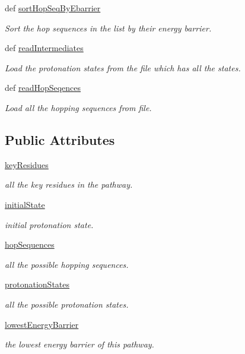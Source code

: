 \begin{DoxyCompactItemize}
def \hyperlink{classxhbpathpy_1_1hb_path_1_1_hb_path_a0b4b8d9d382c3b83d5c8d6c0b4078604}{sort\-Hop\-Seq\-By\-Ebarrier}
\begin{DoxyCompactList}\small\item\em Sort the hop sequences in the list by their energy barrier. \end{DoxyCompactList}\item 
def \hyperlink{classxhbpathpy_1_1hb_path_1_1_hb_path_aca89881c314dad892de2ce8867fda4cf}{read\-Intermediates}
\begin{DoxyCompactList}\small\item\em Load the protonation states from the file which has all the states. \end{DoxyCompactList}\item 
def \hyperlink{classxhbpathpy_1_1hb_path_1_1_hb_path_a05f97f58d06c7ed452eb57ccd4723c69}{read\-Hop\-Seqences}
\begin{DoxyCompactList}\small\item\em Load all the hopping sequences from file. \end{DoxyCompactList}\end{DoxyCompactItemize}
\subsection*{Public Attributes}
\begin{DoxyCompactItemize}
\item 
\hyperlink{classxhbpathpy_1_1hb_path_1_1_hb_path_aafe90d4a4166ba875aab2cee3012cd69}{key\-Residues}
\begin{DoxyCompactList}\small\item\em all the key residues in the pathway. \end{DoxyCompactList}\item 
\hyperlink{classxhbpathpy_1_1hb_path_1_1_hb_path_a702f32f452e98cca922244b5d003861a}{initial\-State}
\begin{DoxyCompactList}\small\item\em initial protonation state. \end{DoxyCompactList}\item 
\hyperlink{classxhbpathpy_1_1hb_path_1_1_hb_path_a35382dbb6cd72418f95343650fde976e}{hop\-Sequences}
\begin{DoxyCompactList}\small\item\em all the possible hopping sequences. \end{DoxyCompactList}\item 
\hyperlink{classxhbpathpy_1_1hb_path_1_1_hb_path_aac00fb2999e064916005328fd4032763}{protonation\-States}
\begin{DoxyCompactList}\small\item\em all the possible protonation states. \end{DoxyCompactList}\item 
\hyperlink{classxhbpathpy_1_1hb_path_1_1_hb_path_a46d9c978e67884c56826acc632b2b242}{lowest\-Energy\-Barrier}
\begin{DoxyCompactList}\small\item\em the lowest energy barrier of this pathway. \end{DoxyCompactList}\end{DoxyCompactItemize}
